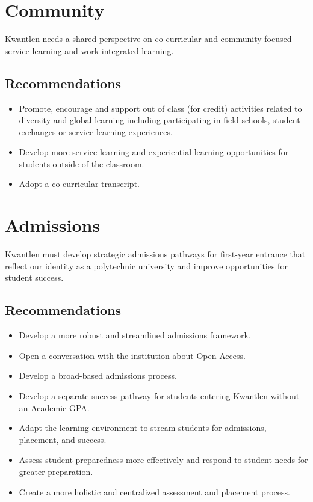 \documentclass[10pt, letterpaper]{article}
\begin{document}
\section{Community}

Kwantlen needs a shared perspective on co-curricular and
community-focused service learning and work-integrated learning.

\subsection{Recommendations}

\begin{itemize}
\item
  Promote, encourage and support out of class (for credit) activities
  related to diversity and global learning including participating in
  field schools, student exchanges or service learning experiences.
\item
  Develop more service learning and experiential learning opportunities
  for students outside of the classroom.
\item
  Adopt a co-curricular transcript.
\end{itemize}

\section{Admissions}

Kwantlen must develop strategic admissions pathways for first-year
entrance that reflect our identity as a polytechnic university and
improve opportunities for student success.

\subsection{Recommendations}

\begin{itemize}
\item
  Develop a more robust and streamlined admissions framework.
\item
  Open a conversation with the institution about Open Access.
\item
  Develop a broad-based admissions process.
\item
  Develop a separate success pathway for students entering Kwantlen
  without an Academic GPA.
\item
  Adapt the learning environment to stream students for admissions,
  placement, and success.
\item
  Assess student preparedness more effectively and respond to student
  needs for greater preparation.
\item
  Create a more holistic and centralized assessment and placement
  process.
\end{itemize}
\end{document}
